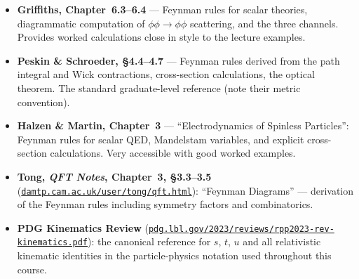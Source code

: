 \documentclass[../main.tex]{subfiles}
\begin{document}
\begin{itemize}
  \item \textbf{Griffiths, Chapter~6.3--6.4} — Feynman rules for scalar theories,
    diagrammatic computation of $\phi\phi \to \phi\phi$ scattering, and the three
    channels.  Provides worked calculations close in style to the lecture examples.

  \item \textbf{Peskin \& Schroeder, \S4.4--4.7} — Feynman rules derived from the
    path integral and Wick contractions, cross-section calculations, the optical
    theorem.  The standard graduate-level reference (note their metric convention).

  \item \textbf{Halzen \& Martin, Chapter~3} — ``Electrodynamics of Spinless
    Particles'': Feynman rules for scalar QED, Mandelstam variables, and explicit
    cross-section calculations.  Very accessible with good worked examples.

  \item \textbf{Tong, \textit{QFT Notes}, Chapter~3, \S3.3--3.5}
    (\href{https://www.damtp.cam.ac.uk/user/tong/qft.html}{\texttt{damtp.cam.ac.uk/user/tong/qft.html}}):
    ``Feynman Diagrams'' — derivation of the Feynman rules including symmetry
    factors and combinatorics.

  \item \textbf{PDG Kinematics Review}
    (\href{https://pdg.lbl.gov/2023/reviews/rpp2023-rev-kinematics.pdf}{\texttt{pdg.lbl.gov/2023/reviews/rpp2023-rev-kinematics.pdf}}):
    the canonical reference for $s$, $t$, $u$ and all relativistic kinematic
    identities in the particle-physics notation used throughout this course.
\end{itemize}
\end{document}
